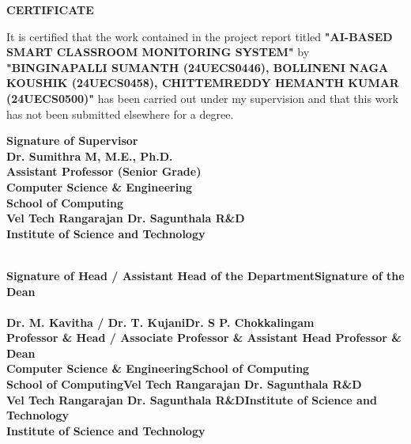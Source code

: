 \documentclass[10pt]{report}
\begin{document}
\begin{center}
{\Huge \textbf{CERTIFICATE}}\\[1cm]
\end{center}
\linespread{1.5}
\large{It is certified that the work contained in the project report titled \textbf{"AI-BASED SMART CLASSROOM MONITORING SYSTEM"} by \textbf{"BINGINAPALLI SUMANTH (24UECS0446), BOLLINENI NAGA KOUSHIK (24UECS0458), CHITTEMREDDY HEMANTH KUMAR (24UECS0500)"} has been carried out under my supervision and that this work has not
been submitted elsewhere for a degree.}
\vspace{1.5cm}
\begin{flushright}
\textbf{Signature of Supervisor\\Dr. Sumithra M, M.E., Ph.D.\\Assistant Professor (Senior Grade)\\Computer Science \&
Engineering\\School of Computing\\Vel Tech Rangarajan Dr. Sagunthala R\&D\\Institute of Science and
Technology\\}\\[2.0cm]

\end{flushright}
\begin{flushleft}
    

\textbf{Signature of Head / Assistant Head of the Department\hfill\textbf{Signature of the Dean }\\\\Dr. M. Kavitha / Dr. T. Kujani\hfill\textbf{Dr. S P. Chokkalingam
} \\Professor \& Head / Associate Professor \& Assistant Head \hfill\textbf{Professor \& Dean}\\Computer
Science \& Engineering\hfill\textbf{School of Computing}\\{School of Computing}\hfill\textbf{Vel Tech Rangarajan Dr. Sagunthala R\&D}\\Vel Tech Rangarajan Dr. Sagunthala R\&D\hfill\textbf{Institute of
Science and Technology}\\{Institute of
Science and Technology}\hfill\textbf{}\\}\\\textbf{{}}\hfill\textbf{}\\\\
\end{flushleft}
\end{document}
